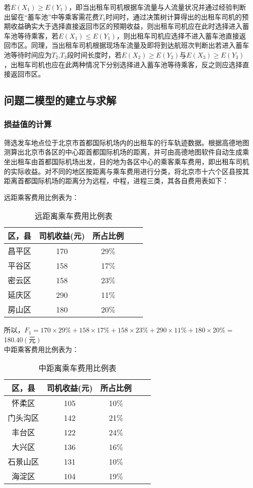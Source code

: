 \documentclass[withoutpreface,bwprint]{cumcmthesis} %
\begin{document}
\newpage
若$E(X_1)≥E(Y_1)$，即当出租车司机根据车流量与人流量状况并通过经验判断出留在“蓄车池”中等乘客需花费$T_1$时间时，通过决策树计算得出的出租车司机的预期收益确实大于选择直接返回市区的预期收益，则出租车司机应在此时选择进入蓄车池等待乘客，若$E(X_1)≤E(Y_1)$，则出租车司机应选择不进入蓄车池直接返回市区。同理，当出租车司机根据现场车流量及即将到达航班次判断出若进入蓄车池等待时间应为$T_2$,$T_3$段时间长度时，若$E(X_2)≥E(Y_2)$与$E(X_3)≥E(Y_3)$，出租车司机也应在此两种情况下分别选择进入蓄车池等待乘客，反之则应选择直接返回市区。

\subsection{问题二模型的建立与求解}
\subsubsection{损益值的计算}
筛选发车地点位于北京市首都国际机场内的出租车的行车轨迹数据。根据高德地图测算出北京市各区的中心距首都国际机场的距离，并可由高德地图软件自动生成乘坐出租车由首都国际机场出发，目的地为各区中心的乘客乘车费用，即出租车司机的实际收益。对不同的地区按距离与乘车费用进行分类，将北京市十六个区县按其距离首都国际机场的距离分为远程，中程，进程三类，其各自费用表如下：

远距乘客费用比例表为：
\begin{table}[!htbp]
	\caption{远距离乘车费用比例表}\label{tab:001} \centering
	\begin{tabular}{ccccc}
		\toprule[2pt]
		区，县 & 司机收益(元) & 所占比例\\
		\midrule[1pt]
		昌平区 & 170 & 29$\%$\\
		平谷区 & 158 & 17$\%$\\
		密云区 & 158 & 23$\%$\\
		延庆区 & 290 & 11$\%$\\
		房山区 & 180 & 20$\%$\\
		\bottomrule[1.5pt]
	\end{tabular}
\end{table}

所以，$F_{1}=170 \times 29 \%+158 \times 17 \%+158 \times 23 \%+290 \times 11 \%+180 \times 20 \%=$
180.40$({\text{元}})$\\

中距乘客费用比例表为：

\begin{table}[!htbp]
	\caption{中距离乘车费用比例表}\label{tab:001} \centering
	\begin{tabular}{ccccc}
		\toprule[2pt]
		区，县 & 司机收益(元) & 所占比例\\
		\midrule[1pt]
		怀柔区 & 105 & 10$\%$\\
		门头沟区 & 142 & 21$\%$\\
		丰台区 & 122 & 24$\%$\\
		大兴区 & 136 & 16$\%$\\
		石景山区 & 131 & 10$\%$\\
		海淀区 & 104 & 19$\%$\\
		\bottomrule[1.5pt]
	\end{tabular}
\end{table}
\end{document}

